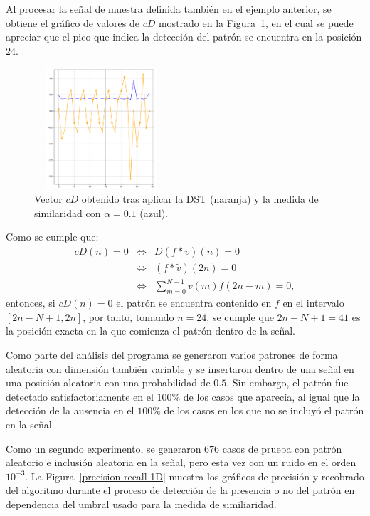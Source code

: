 \par Al procesar la se\~nal de muestra definida tambi\'en en el ejemplo anterior, se obtiene el gr\'afico de valores de $cD$ mostrado en la Figura~\ref{PatternDetect1D}, en el cual se puede apreciar que el pico que indica la detecci\'on del patr\'on se encuentra en la posici\'on $24$.

\begin{figure}[h]
\center
\includegraphics[width=50mm,height=45mm]{Graphics/patternDetected1D.png}
\caption{Vector $cD$ obtenido tras aplicar la DST (naranja) y la medida de similaridad con $\alpha=0.1$ (azul).}
\label{PatternDetect1D}
\end{figure}

\par Como se cumple que:
\begin{eqnarray}
cD(n)=0&\Leftrightarrow& D(f\ast\tilde{v})(n)=0\nonumber\\
&\Leftrightarrow&(f\ast\tilde{v})(2n)=0\nonumber\\
&\Leftrightarrow&\sum_{m=0}^{N-1}v(m)f(2n-m)=0,\nonumber
\end{eqnarray}
entonces, si $cD(n)=0$ el patr\'on se encuentra contenido en $f$ en el intervalo\linebreak $[2n-N+1,2n]$, por tanto, tomando $n=24$, se cumple que $2n-N+1=41$ es la posici\'on exacta en la que comienza el patr\'on dentro de la se\~nal.

\par Como parte del an\'alisis del programa se generaron varios patrones de forma aleatoria con dimensi\'on tambi\'en variable y se insertaron dentro de una se\~nal en una posici\'on aleatoria con una probabilidad de $0.5$. Sin embargo, el patr\'on fue detectado satisfactoriamente en el $100\%$ de los casos que aparec\'ia, al igual que la detecci\'on de la ausencia en el $100\%$ de los casos en los que no se incluy\'o el patr\'on en la se\~nal.\\

\par Como un segundo experimento, se generaron $676$ casos de prueba con patr\'on aleatorio e inclusi\'on aleatoria en la se\~nal, pero esta vez con un ruido en el orden $10^{-3}$.  La Figura~\ref{precision-recall-1D} muestra los gr\'aficos de precisi\'on y recobrado del algoritmo durante el proceso de detecci\'on de la presencia o no del patr\'on en dependencia del umbral usado para la medida de similiaridad.

